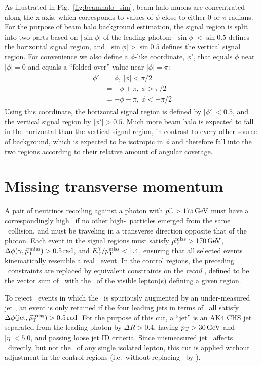 As illustrated in Fig.~\ref{fig:beamhalo_sim}, beam halo muons are concentrated along the x-axis, which corresponds to values of $\phi$ close to either 0 or $\pi$ radians.
For the purpose of beam halo background estimation, the signal region is split into two parts based on $|\sin{\phi}|$ of the leading photon: $|\sin{\phi}| < \sin{0.5}$ defines
the horizontal signal region, and $|\sin{\phi}| > \sin{0.5}$ defines the vertical signal region. For convenience we also define a $\phi$-like coordinate, $\phi'$, that equals $\phi$ near
$|\phi| = 0$ and equals a ``folded-over'' value near $|\phi| = \pi$:
\begin{align}
\begin{split}
\phi' & = \phi,\ |\phi| < \pi/2 \\
      & = -\phi + \pi,\ \phi > \pi/2 \\
      & = -\phi - \pi,\ \phi < -\pi/2
\end{split}
\label{eq:phiprime}
\end{align}
Using this coordinate, the horizontal signal region is defined by $|\phi'| < 0.5$, and the vertical signal region by $|\phi'| > 0.5$. Much more beam halo is expected to fall in the horizontal than the vertical
signal region, in contrast to every other source of background, which is expected to be isotropic in $\phi$ and therefore fall into the two regions according to their
relative amount of angular coverage.

\section{Missing transverse momentum} \label{sec:event_selection_MET}
A pair of neutrinos recoiling against a photon with $\pTgamma > 175\unit{GeV}$ must have a correspondingly high \pT\ if no other high-\pT\ particles emerged
from the same \Pp\Pp\ collision, and must be traveling in a transverse direction opposite that of the photon. Each event in the signal regions must satisfy
$\MET > 170\unit{GeV}$, $\Delta\phi(\Pgamma,\vecMET) > 0.5\unit{rad}$, and $\ETgamma/\MET < 1.4$, ensuring that all selected events kinematically resemble a real \zinvg\ event.
In the control regions, the preceding \vecMET\ constraints are replaced by equivalent constraints on the \textit{recoil} \vecrecoil, defined to be the vector sum of \vecMET\ with
the \vecpT\ of the visible lepton(s) defining a given region.

To reject \gjets\ events in which the \MET\ is spuriously augmented by an under-measured jet \pT,
an event is only retained if the four leading jets in terms of \pT\ all satisfy $\Delta\phi(\mathrm{jet},\vecMET) > 0.5\unit{rad}$.
For the purpose of this cut, a ``jet'' is an AK4 CHS jet separated from the leading photon by $\Delta R > 0.4$, having $\pT > 30\unit{GeV}$ and
$|\eta| < 5.0$, and passing loose jet ID criteria. Since mismeasured jet \vecpT\ affects \vecMET\ directly, but not the \vecpT\ of any single
isolated lepton, this cut is applied without adjustment in the control regions (i.e.\ without replacing \vecMET\ by \vecrecoil).

